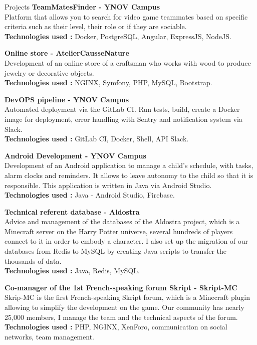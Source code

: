 \documentclass[
	10pt, %
]{resume}
\begin{document}
\begin{rSection}{Projects}
	{\bf TeamMatesFinder - YNOV Campus}
	\\ Platform that allows you to search for video game teammates based on specific criteria such as their level, their role or if they are sociable.
	\\ \textbf{Technologies used :} Docker, PostgreSQL, Angular, ExpressJS, NodeJS.

	{\bf Online store - AtelierCausseNature}
	\\ Development of an online store of a craftsman who works with wood to produce jewelry or decorative objects.
	\\ \textbf{Technologies used :} NGINX, Symfony, PHP, MySQL, Bootstrap.

	{\bf DevOPS pipeline - YNOV Campus}
	\\ Automated deployment via the GitLab CI. Run tests, build, create a Docker image for deployment, error handling with Sentry and notification system via Slack.
	\\ \textbf{Technologies used : }GitLab CI, Docker, Shell, API Slack.

	{\bf Android Development - YNOV Campus}
	\\ Development of an Android application to manage a child’s schedule, with tasks, alarm clocks and reminders. 
	It allows to leave autonomy to the child so that it is responsible. This application is written in Java via Android Studio.
	\\ \textbf{Technologies used :} Java - Android Studio, Firebase.

	{\bf Technical referent database - Aldostra}
	\\ Advice and management of the databases of the Aldostra project, which is a Minecraft server on the Harry Potter universe, several hundreds of players 
	connect to it in order to embody a character. I also set up the migration of our databases from Redis to MySQL by creating Java scripts to transfer the thousands of data.
	\\ \textbf{Technologies used :} Java, Redis, MySQL.

	{\bf Co-manager of the 1st French-speaking forum Skript - Skript-MC}
	\\ Skrip-MC is the first French-speaking Skript forum, which is a Minecraft plugin allowing to simplify the development on the game. 
	Our community has nearly 25,000 members, I manage the team and the technical aspects of the forum.
	\\ \textbf{Technologies used :} PHP, NGINX, XenForo, communication on social networks, team management.


\end{rSection}
\end{document}
